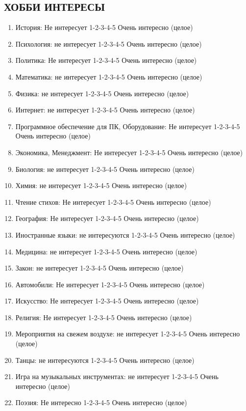 \documentclass[11pt]{article}
\begin{document}
\subsection{ХОББИ ИНТЕРЕСЫ}
\begin{enumerate}
\item История: Не интересует 1-2-3-4-5 Очень интересно (целое)
\item Психология: не интересует 1-2-3-4-5 Очень интересно (целое)
\item Политика: Не интересует 1-2-3-4-5 Очень интересно (целое)
\item Математика: не интересует 1-2-3-4-5 Очень интересно (целое)
\item Физика: не интересует 1-2-3-4-5 Очень интересно (целое)
\item Интернет: не интересует 1-2-3-4-5 Очень интересно (целое)
\item Программное обеспечение для ПК, Оборудование: Не интересует 1-2-3-4-5 Очень интересно (целое)
\item Экономика, Менеджмент: Не интересует 1-2-3-4-5 Очень интересно (целое)
\item Биология: не интересует 1-2-3-4-5 Очень интересно (целое)
\item Химия: не интересует 1-2-3-4-5 Очень интересно (целое)
\item Чтение стихов: Не интересует 1-2-3-4-5 Очень интересно (целое)
\item География: Не интересует 1-2-3-4-5 Очень интересно (целое)
\item Иностранные языки: не интересуются 1-2-3-4-5 Очень интересно (целое)
\item Медицина: не интересует 1-2-3-4-5 Очень интересно (целое)
\item Закон: не интересует 1-2-3-4-5 Очень интересно (целое)
\item Автомобили: Не интересует 1-2-3-4-5 Очень интересно (целое)
\item Искусство: Не интересует 1-2-3-4-5 Очень интересно (целое)
\item Религия: Не интересует 1-2-3-4-5 Очень интересно (целое)
\item Мероприятия на свежем воздухе: не интересует 1-2-3-4-5 Очень интересно (целое)
\item Танцы: не интересуются 1-2-3-4-5 Очень интересно (целое)
\item Игра на музыкальных инструментах: не интересует 1-2-3-4-5 Очень интересно (целое)
\item Поэзия: Не интересно 1-2-3-4-5 Очень интересно (целое)

\end{enumerate}
\end{document}
